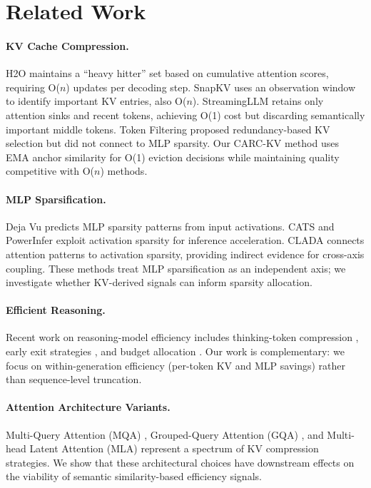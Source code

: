 \documentclass[11pt,a4paper]{article}
\begin{document}
\section{Related Work}
\label{sec:related}

\paragraph{KV Cache Compression.}
H2O \cite{zhang2024h2o} maintains a ``heavy hitter'' set based on cumulative attention scores, requiring O($n$) updates per decoding step.
SnapKV \cite{li2024snapkv} uses an observation window to identify important KV entries, also O($n$).
StreamingLLM \cite{xiao2024streamingllm} retains only attention sinks and recent tokens, achieving O(1) cost but discarding semantically important middle tokens.
Token Filtering \cite{cao2024tokenfiltering} proposed redundancy-based KV selection but did not connect to MLP sparsity.
Our CARC-KV method uses EMA anchor similarity for O(1) eviction decisions while maintaining quality competitive with O($n$) methods.

\paragraph{MLP Sparsification.}
Deja Vu \cite{liu2023dejavu} predicts MLP sparsity patterns from input activations.
CATS \cite{lee2024cats} and PowerInfer \cite{song2024powerinfer} exploit activation sparsity for inference acceleration.
CLADA \cite{song2024clada} connects attention patterns to activation sparsity, providing indirect evidence for cross-axis coupling.
These methods treat MLP sparsification as an independent axis; we investigate whether KV-derived signals can inform sparsity allocation.

\paragraph{Efficient Reasoning.}
Recent work on reasoning-model efficiency includes thinking-token compression \cite{chen2024thinkingcompression}, early exit strategies \cite{wang2024earlyexit}, and budget allocation \cite{muennighoff2025s1}.
Our work is complementary: we focus on within-generation efficiency (per-token KV and MLP savings) rather than sequence-level truncation.

\paragraph{Attention Architecture Variants.}
Multi-Query Attention (MQA) \cite{shazeer2019mqa}, Grouped-Query Attention (GQA) \cite{ainslie2023gqa}, and Multi-head Latent Attention (MLA) \cite{liu2024deepseekv2} represent a spectrum of KV compression strategies.
We show that these architectural choices have downstream effects on the viability of semantic similarity-based efficiency signals.
\end{document}
